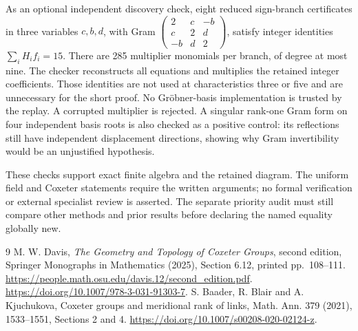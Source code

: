 \documentclass[11pt]{article}
\begin{document}
As an optional independent discovery check, eight reduced sign-branch
certificates in three variables $c,b,d$, with Gram
$\left(\begin{smallmatrix}2&c&-b\\c&2&d\\-b&d&2\end{smallmatrix}\right)$,
satisfy integer identities $\sum_i H_i f_i=15$.
There are 285 multiplier monomials per branch, of degree at most nine.
The checker reconstructs all equations and multiplies the retained
integer coefficients. Those identities are not used at
characteristics three or five and are unnecessary for the short proof.
No Gr\"obner-basis implementation is trusted by the replay.
A corrupted multiplier is rejected. A singular rank-one Gram form on
four independent basis roots is also checked as a positive control:
its reflections still have independent displacement directions,
showing why Gram invertibility would be an unjustified hypothesis.

These checks support exact finite algebra and the retained diagram.
The uniform field and Coxeter statements require the written arguments;
no formal verification or external specialist review is asserted.
The separate priority audit must still compare other methods and prior
results before declaring the named equality globally new.

\begin{thebibliography}{9}
 M. W. Davis, \emph{The Geometry and Topology of
Coxeter Groups}, second edition, Springer Monographs in Mathematics
(2025), Section 6.12, printed pp.~108--111.
\url{https://people.math.osu.edu/davis.12/second_edition.pdf}.
\url{https://doi.org/10.1007/978-3-031-91303-7}.
 S. Baader, R. Blair and A. Kjuchukova,
Coxeter groups and meridional rank of links,
Math. Ann. 379 (2021), 1533--1551, Sections 2 and 4.
\url{https://doi.org/10.1007/s00208-020-02124-z}.
\end{thebibliography}
\end{document}
